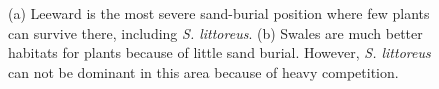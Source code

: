 \documentclass[]{interact}
\theoremstyle{plain}%
\theoremstyle{definition}
\theoremstyle{remark}
\begin{document}
\begin{figure}
  \centering
  \hspace{5pt}
  \caption{(a) Leeward is the most severe sand-burial position where few plants can survive there, including \textit{S. littoreus}. (b) Swales are much better habitats for plants because of little sand burial. However, \textit{S. littoreus} can not be dominant in this area because of heavy competition.} 
  \label{fig:leeward_swale}
\end{figure}
\end{document}
